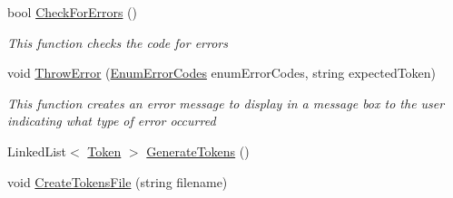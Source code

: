 \begin{DoxyCompactItemize}
bool \hyperlink{class_c_p_u___o_s___simulator_1_1_compiler_1_1_frontend_1_1_lexer_a55107682df54c395363fa466bbd47be9}{Check\+For\+Errors} ()
\begin{DoxyCompactList}\small\item\em This function checks the code for errors \end{DoxyCompactList}\item 
void \hyperlink{class_c_p_u___o_s___simulator_1_1_compiler_1_1_frontend_1_1_lexer_a64e6ce60e37e5cf153dbbc8757fea55c}{Throw\+Error} (\hyperlink{namespace_c_p_u___o_s___simulator_1_1_compiler_1_1_frontend_a268b68f35fd94ce3549dd33a7e77d7e8}{Enum\+Error\+Codes} enum\+Error\+Codes, string expected\+Token)
\begin{DoxyCompactList}\small\item\em This function creates an error message to display in a message box to the user indicating what type of error occurred \end{DoxyCompactList}\item 
Linked\+List$<$ \hyperlink{class_c_p_u___o_s___simulator_1_1_compiler_1_1_frontend_1_1_tokens_1_1_token}{Token} $>$ \hyperlink{class_c_p_u___o_s___simulator_1_1_compiler_1_1_frontend_1_1_lexer_a9af12a452db042cfa2552078ca991160}{Generate\+Tokens} ()
\item 
void \hyperlink{class_c_p_u___o_s___simulator_1_1_compiler_1_1_frontend_1_1_lexer_aabdf7836b845bde22402027bdb1e949f}{Create\+Tokens\+File} (string filename)
\end{DoxyCompactItemize}
